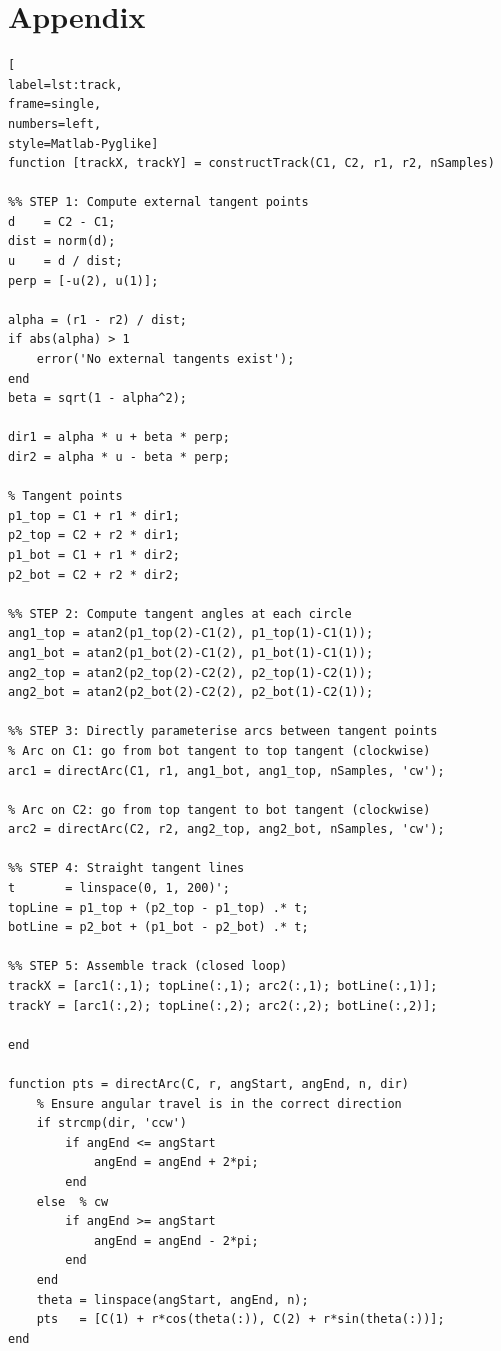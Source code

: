 \section{Appendix}

\begin{lstlisting}[
label=lst:track,
frame=single,
numbers=left,
style=Matlab-Pyglike]
function [trackX, trackY] = constructTrack(C1, C2, r1, r2, nSamples)

%% STEP 1: Compute external tangent points
d    = C2 - C1;
dist = norm(d);
u    = d / dist;
perp = [-u(2), u(1)];

alpha = (r1 - r2) / dist;
if abs(alpha) > 1
    error('No external tangents exist');
end
beta = sqrt(1 - alpha^2);

dir1 = alpha * u + beta * perp;
dir2 = alpha * u - beta * perp;

% Tangent points
p1_top = C1 + r1 * dir1;
p2_top = C2 + r2 * dir1;
p1_bot = C1 + r1 * dir2;
p2_bot = C2 + r2 * dir2;

%% STEP 2: Compute tangent angles at each circle
ang1_top = atan2(p1_top(2)-C1(2), p1_top(1)-C1(1));
ang1_bot = atan2(p1_bot(2)-C1(2), p1_bot(1)-C1(1));
ang2_top = atan2(p2_top(2)-C2(2), p2_top(1)-C2(1));
ang2_bot = atan2(p2_bot(2)-C2(2), p2_bot(1)-C2(1));

%% STEP 3: Directly parameterise arcs between tangent points
% Arc on C1: go from bot tangent to top tangent (clockwise)
arc1 = directArc(C1, r1, ang1_bot, ang1_top, nSamples, 'cw');

% Arc on C2: go from top tangent to bot tangent (clockwise)
arc2 = directArc(C2, r2, ang2_top, ang2_bot, nSamples, 'cw');

%% STEP 4: Straight tangent lines
t       = linspace(0, 1, 200)';
topLine = p1_top + (p2_top - p1_top) .* t;
botLine = p2_bot + (p1_bot - p2_bot) .* t;

%% STEP 5: Assemble track (closed loop)
trackX = [arc1(:,1); topLine(:,1); arc2(:,1); botLine(:,1)];
trackY = [arc1(:,2); topLine(:,2); arc2(:,2); botLine(:,2)];

end

function pts = directArc(C, r, angStart, angEnd, n, dir)
    % Ensure angular travel is in the correct direction
    if strcmp(dir, 'ccw')
        if angEnd <= angStart
            angEnd = angEnd + 2*pi;
        end
    else  % cw
        if angEnd >= angStart
            angEnd = angEnd - 2*pi;
        end
    end
    theta = linspace(angStart, angEnd, n);
    pts   = [C(1) + r*cos(theta(:)), C(2) + r*sin(theta(:))];
end
\end{lstlisting}